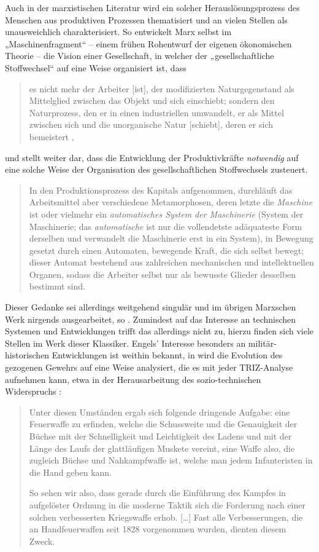 \documentclass[11pt,a4paper]{article}
\begin{document}
Auch in der marxistischen Literatur wird ein solcher Herauslösungsprozess des
Menschen aus produktiven Prozessen thematisiert und an vielen Stellen als
unausweichlich charakterisiert.  So entwickelt Marx selbst im
„Maschinenfragment“ \cite[S. 570 ff.]{MEW42} -- einem frühen Rohentwurf der
eigenen ökonomischen Theorie -- die Vision einer Gesellschaft, in welcher der
„gesellschaftliche Stoffwechsel“ \cite[S. 37]{MEW23} auf eine Weise
organisiert ist, dass
\begin{quote}
  es nicht mehr der Arbeiter [ist], der modifizierten Naturgegenstand als
  Mittelglied zwischen das Objekt und sich einschiebt; sondern den
  Naturprozess, den er in einen industriellen umwandelt, er als Mittel
  zwischen sich und die unorganische Natur [schiebt], deren er sich
  bemeistert \cite[S. 572]{MEW42},
\end{quote}
und stellt weiter dar, dass die Entwicklung der Produktivkräfte
\emph{notwendig} auf eine solche Weise der Organisation des gesellschaftlichen
Stoffwechsels zusteuert.
\begin{quote}
  In den Produktionsprozess des Kapitals aufgenommen, durchläuft das
  Arbeitsmittel aber verschiedene Metamorphosen, deren letzte die
  \emph{Maschine} ist oder vielmehr ein \emph{automatisches System der
    Maschinerie} (System der Maschinerie; das \emph{automatische} ist nur die
  vollendetste adäquateste Form derselben und verwandelt die Maschinerie erst
  in ein System), in Bewegung gesetzt durch einen Automaten, bewegende Kraft,
  die sich selbst bewegt; dieser Automat bestehend aus zahlreichen mechanischen
  und intellektuellen Organen, sodass die Arbeiter selbst nur als bewusste
  Glieder desselben bestimmt sind. \cite[S. 584]{MEW42}
\end{quote}
Dieser Gedanke sei allerdings weitgehend singulär und im übrigen Marxschen
Werk nirgends ausgearbeitet, so \cite{Goldberg2016}. Zumindest auf das
Interesse an technischen Systemen und Entwicklungen trifft das allerdings
nicht zu, hierzu finden sich viele Stellen im Werk dieser Klassiker. Engels'
Interesse besonders an militär-historischen Entwicklungen ist weithin bekannt,
in \cite{MEW15} wird die Evolution des gezogenen Gewehrs auf eine Weise
analysiert, die es mit jeder TRIZ-Analyse aufnehmen kann, etwa in der
Herausarbeitung des sozio-technischen Widerspruchs \cite[S. 199]{MEW15}:
\begin{quote}
  Unter diesen Umständen ergab sich folgende dringende Aufgabe: eine
  Feuerwaffe zu erfinden, welche die Schussweite und die Genauigkeit der
  Büchse mit der Schnelligkeit und Leichtigkeit des Ladens und mit der Länge
  des Laufs der glattläufigen Muskete vereint, eine Waffe also, die zugleich
  Büchse und Nahkampfwaffe ist, welche man jedem Infanteristen in die Hand
  geben kann.

  So sehen wir also, dass gerade durch die Einführung des Kampfes in
  aufgelöster Ordnung in die moderne Taktik sich die Forderung nach einer
  solchen verbesserten Kriegswaffe erhob. [\ldots] Fast alle Verbesserungen,
  die an Handfeuerwaffen seit 1828 vorgenommen wurden, dienten diesem Zweck.
\end{quote}
\end{document}
